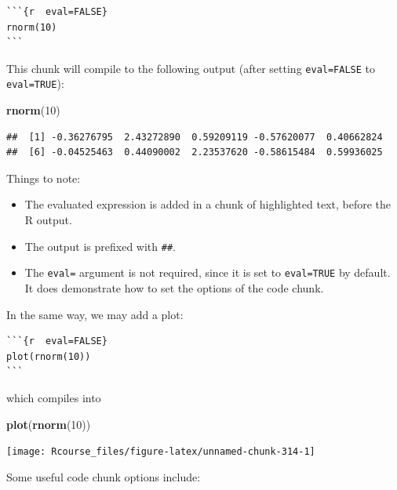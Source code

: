 \documentclass[]{book}
\newenvironment{Shaded}{\begin{snugshade}}{\end{snugshade}}
\newcommand{\KeywordTok}[1]{\textcolor[rgb]{0.13,0.29,0.53}{\textbf{#1}}}
\newcommand{\DecValTok}[1]{\textcolor[rgb]{0.00,0.00,0.81}{#1}}
\newcommand{\NormalTok}[1]{#1}
\providecommand{\tightlist}{%
  \setlength{\itemsep}{0pt}\setlength{\parskip}{0pt}}
\theoremstyle{definition}
\theoremstyle{definition}
\theoremstyle{definition}
\theoremstyle{remark}
\begin{document}
\begin{verbatim}
```{r  eval=FALSE}
rnorm(10)
```
\end{verbatim}

This chunk will compile to the following output (after setting
\texttt{eval=FALSE} to \texttt{eval=TRUE}):

\begin{Shaded}
\begin{Highlighting}[]
\KeywordTok{rnorm}\NormalTok{(}\DecValTok{10}\NormalTok{)}
\end{Highlighting}
\end{Shaded}

\begin{verbatim}
##  [1] -0.36276795  2.43272890  0.59209119 -0.57620077  0.40662824
##  [6] -0.04525463  0.44090002  2.23537620 -0.58615484  0.59936025
\end{verbatim}

Things to note:

\begin{itemize}
\tightlist
\item
  The evaluated expression is added in a chunk of highlighted text,
  before the R output.
\item
  The output is prefixed with \texttt{\#\#}.
\item
  The \texttt{eval=} argument is not required, since it is set to
  \texttt{eval=TRUE} by default. It does demonstrate how to set the
  options of the code chunk.
\end{itemize}

In the same way, we may add a plot:

\begin{verbatim}
```{r  eval=FALSE}
plot(rnorm(10))
```
\end{verbatim}

which compiles into

\begin{Shaded}
\begin{Highlighting}[]
\KeywordTok{plot}\NormalTok{(}\KeywordTok{rnorm}\NormalTok{(}\DecValTok{10}\NormalTok{))}
\end{Highlighting}
\end{Shaded}

\texttt{[image: Rcourse\_files/figure-latex/unnamed-chunk-314-1]}

Some useful code chunk options include:
\end{document}
